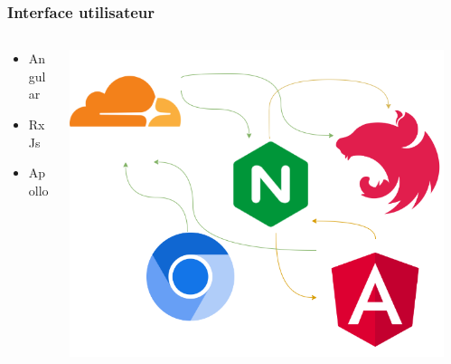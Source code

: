 \documentclass[aspectratio=169]{beamer}
\begin{document}
    \begin{frame}
        \frametitle{Interface utilisateur}
        \begin{columns}
            \begin{column}{0.5\textwidth}
                \begin{itemize}
                    \item Angular
                    \item RxJs
                    \item Apollo
                \end{itemize}
            \end{column}
            \begin{column}{0.5\textwidth}
                \begin{flushleft}
                    \includegraphics[width=1\textwidth]{imgs/frontToBack}\label{fig:diagram}
                \end{flushleft}
            \end{column}
            \begin{column}{0.2\textwidth}

            \end{column}
        \end{columns}


    \end{frame}
\end{document}
